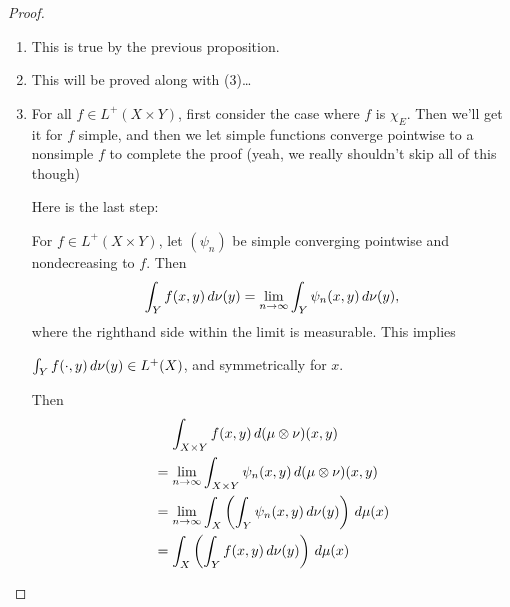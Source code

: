\documentclass[11pt,leqno,oneside]{amsbook}
\numberwithin{thm}{section}
\newcommand{\x}{\times}
\newcommand{\ox}{\otimes}
\begin{document}
\begin{proof}
  \mbox{}
  \begin{enumerate}[label=(\arabic{*})]
    \item This is true by the previous proposition.
    \item This will be proved along with (3)\ldots
    \item For all $f \in L^+(X \x Y)$, first consider the case where $f$ is $\chi_E$.  Then we'll get it for $f$ simple, and then we let simple functions converge pointwise to a nonsimple $f$ to complete the proof (yeah, we really shouldn't skip all of this though)

    Here is the last step:

    For $f \in L^+(X \x Y)$, let $(\psi_n)$ be simple converging pointwise and nondecreasing to $f$.  Then $$\int_Y f(x,y) \, d\nu(y) = \lim_{n \to \infty} \int_Y \psi_n(x,y) \, d\nu(y),$$ where the righthand side within the limit is measurable.  This implies

    $\int_Y f(\cdot, y) \, d\nu(y) \in L^+(X)$, and symmetrically for $x$.

    Then
    \begin{align*}
      &\quad\, \int_{X \x Y} f(x,y) \d(\mu \ox \nu)(x,y) \\
      &= \lim_{n \to \oo} \int_{X \x Y} \psi_n(x,y) \d(\mu \ox \nu)(x,y) \\
      &= \lim_{n \to \oo} \int_{X} \left(\int_{Y} \psi_n(x,y) \d\nu(y) \right) \d \mu(x) \\
      &= \int_{X} \left(\int_{Y} f(x,y) \d\nu(y) \right) \d \mu(x)
    \end{align*}
  \end{enumerate}
\end{proof}
\end{document}
